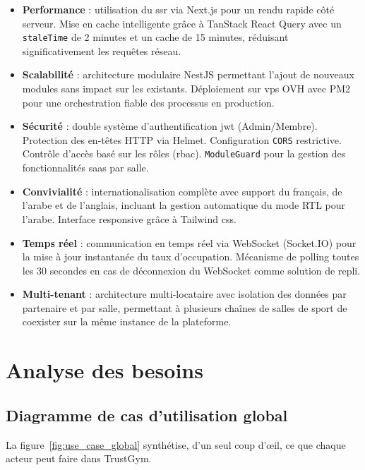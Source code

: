 \documentclass[../main.tex]{subfiles}
\begin{document}
\begin{itemize}
  \item \textbf{Performance} : utilisation du \acrshort{ssr} via Next.js pour un rendu rapide c\^{o}t\'{e} serveur. Mise en cache intelligente gr\^{a}ce \`{a} TanStack React Query avec un \texttt{staleTime} de 2 minutes et un cache de 15 minutes, r\'{e}duisant significativement les requ\^{e}tes r\'{e}seau.

  \item \textbf{Scalabilit\'{e}} : architecture modulaire NestJS permettant l'ajout de nouveaux modules sans impact sur les existants. D\'{e}ploiement sur \acrshort{vps} OVH avec PM2 pour une orchestration fiable des processus en production.

  \item \textbf{S\'{e}curit\'{e}} : double syst\`{e}me d'authentification \acrshort{jwt} (Admin/Membre). Protection des en-t\^{e}tes HTTP via Helmet. Configuration \texttt{CORS} restrictive. Contr\^{o}le d'acc\`{e}s bas\'{e} sur les r\^{o}les (\acrshort{rbac}). \texttt{ModuleGuard} pour la gestion des fonctionnalit\'{e}s \acrshort{saas} par salle.

  \item \textbf{Convivialit\'{e}} : internationalisation compl\`{e}te avec support du fran\c{c}ais, de l'arabe et de l'anglais, incluant la gestion automatique du mode RTL pour l'arabe. Interface responsive gr\^{a}ce \`{a} Tailwind \acrshort{css}.

  \item \textbf{Temps r\'{e}el} : communication en temps r\'{e}el via WebSocket \cite{rfc6455} (Socket.IO) pour la mise \`{a} jour instantan\'{e}e du taux d'occupation. M\'{e}canisme de polling toutes les 30 secondes en cas de d\'{e}connexion du WebSocket comme solution de repli.

  \item \textbf{Multi-tenant} : architecture multi-locataire \cite{bezemer2010multitenancy} avec isolation des donn\'{e}es par partenaire et par salle, permettant \`{a} plusieurs cha\^{i}nes de salles de sport de coexister sur la m\^{e}me instance de la plateforme.
\end{itemize}

\section{Analyse des besoins}

\subsection{Diagramme de cas d'utilisation global}
La figure~\ref{fig:use_case_global} synth\'{e}tise, d'un seul coup d'\oe{}il, ce que chaque acteur peut faire dans TrustGym.
\end{document}

